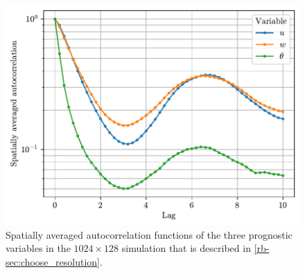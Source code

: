 \documentclass[../main.tex]{subfiles}
\begin{document}
\begin{figure}[ht]
    \centering
    \includegraphics[width=0.6\linewidth]{figures/autocorrelation.pdf}
    \caption{
        Spatially averaged autocorrelation functions of the three prognostic
        variables in the $1024 \times 128$ simulation that is described in
        \cref{rb-sec:choose_resolution}.
    }
    \label{fig:autocorr}
\end{figure}


\ifSubfilesClassLoaded{%
    \emergencystretch=5em
    \printbibliography{}
}{}
\end{document}
